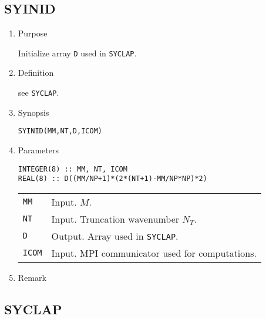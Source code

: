\documentclass[a4paper]{scrartcl}
\begin{document}
\subsection{SYINID}

\begin{enumerate}

\item Purpose

Initialize array \texttt{D} used in \texttt{SYCLAP}.   

\item Definition

see \texttt{SYCLAP}.  

\item Synopsis 

\texttt{SYINID(MM,NT,D,ICOM)}
  
\item Parameters

\begin{verbatim}
INTEGER(8) :: MM, NT, ICOM
REAL(8) :: D((MM/NP+1)*(2*(NT+1)-MM/NP*NP)*2)
\end{verbatim}

\begin{tabular}{ll}
\texttt{MM} & Input. $M$.\\  
\texttt{NT} & Input. Truncation wavenumber $N_T$.\\
\texttt{D} & Output. Array used in \texttt{SYCLAP}.\\
\texttt{ICOM} & Input. MPI communicator used for computations.
\end{tabular}

\item Remark
    
\end{enumerate}


\subsection{SYCLAP}
\end{document}
